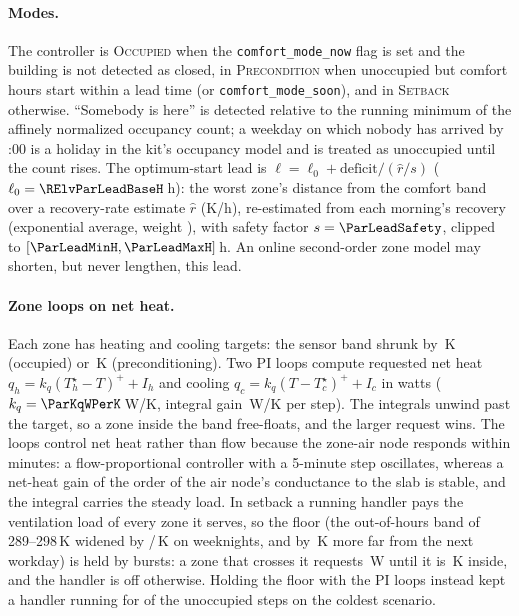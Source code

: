 \paragraph{Modes.} The controller is \textsc{Occupied} when the \texttt{comfort\_mode\_now} flag is set and the building is not detected as closed, in \textsc{Precondition} when unoccupied but comfort hours start within a lead time (or \texttt{comfort\_mode\_soon}), and in \textsc{Setback} otherwise. ``Somebody is here'' is detected relative to the running minimum of the affinely normalized occupancy count; a weekday on which nobody has arrived by \ParHolidayCheckH{}:00 is a holiday in the kit's occupancy model and is treated as unoccupied until the count rises. The optimum-start lead is $\ell = \ell_0 + \text{deficit}/(\hat{r}/s)$ ($\ell_0 = \RElvParLeadBaseH$\,h): the worst zone's distance from the comfort band over a recovery-rate estimate $\hat{r}$ (K/h), re-estimated from each morning's recovery (exponential average, weight \ParRateEma), with safety factor $s=\ParLeadSafety$, clipped to $[\ParLeadMinH, \ParLeadMaxH]$\,h. An online second-order zone model may shorten, but never lengthen, this lead.

\paragraph{Zone loops on net heat.} Each zone has heating and cooling targets: the sensor band shrunk by \ParMarginOcc\,K (occupied) or \ParMarginPre\,K (preconditioning). Two PI loops compute requested net heat $q_h = k_q (T_h^\star - T)^+ + I_h$ and cooling $q_c = k_q (T - T_c^\star)^+ + I_c$ in watts ($k_q = \ParKqWPerK$\,W/K, integral gain \ParKiWPerKStep\,W/K per step). The integrals unwind past the target, so a zone inside the band free-floats, and the larger request wins. The loops control net heat rather than flow because the zone-air node responds within minutes: a flow-proportional controller with a 5-minute step oscillates, whereas a net-heat gain of the order of the air node's conductance to the slab is stable, and the integral carries the steady load. In setback a running handler pays the ventilation load of every zone it serves, so the floor (the out-of-hours band of 289--298\,K widened by \ParNightLowExt{}/\ParNightHighExt\,K on weeknights, and by \RTenWkExtLo\,K more far from the next workday) is held by bursts: a zone that crosses it requests \ParQSbW\,W until it is \ParSbHystK\,K inside, and the handler is off otherwise. Holding the floor with the PI loops instead kept a handler running for \VthreeAhuOnUnocc{} of the unoccupied steps on the coldest scenario.

